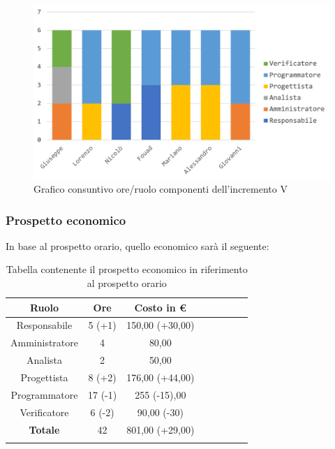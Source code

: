 			\begin{figure}[H]
				\centering
				\includegraphics[width=0.8\linewidth]{images/consuntivo/ConsIncr5-1.png}
				\caption{Grafico consuntivo ore/ruolo componenti dell'incremento V}
				\label{fig:consuntivo grafico suddivione ruoli incremento V}
			\end{figure}
			\pagebreak
			
		\subsubsection{Prospetto economico}
			In base al prospetto orario, quello economico sarà il seguente: 
			
			\begin{longtable}{|c|c|c|c|c|c|c|c}
				\hline
				\rowcolor{lighter-grayer}
				\textbf{Ruolo} & \textbf{Ore} & \textbf{Costo in €} \\
				\hline
				\endfirsthead
				\hline
			Responsabile 	    & 5 (+1) & 150,00 (+30,00)\\
			\hline 
			\hline
			Amministratore	  & 4 & 80,00\\
			\hline
			\hline
			Analista 				& 2 & 50,00\\
			\hline
			\hline
			Progettista 		  & 8 (+2) & 176,00 (+44,00)\\
			\hline
			\hline
			Programmatore 	 & 17 (-1)  & 255 (-15),00 \\
			\hline
			\hline
			Verificatore 		  & 6 (-2) & 90,00 (-30)\\
			\hline
			\textbf{Totale} 	&  42 & 801,00 (+29,00)\\
			\hline
				
				\caption{Tabella contenente il prospetto economico in riferimento al prospetto orario}
			\end{longtable}
			
